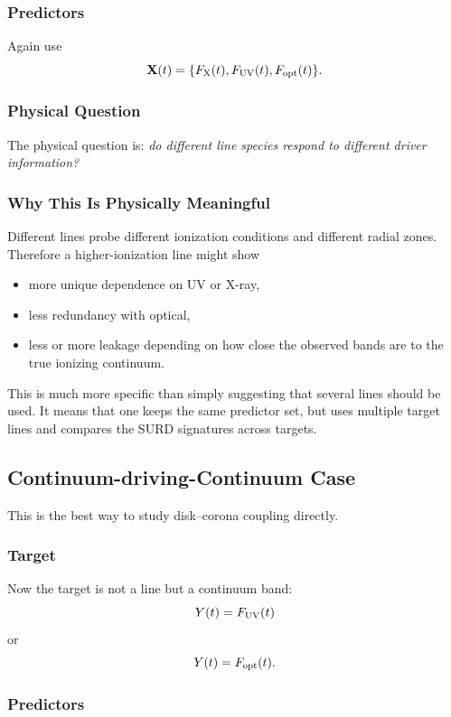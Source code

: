 \documentclass{article}
\begin{document}
\subsubsection{Predictors}

Again use
\[
\mathbf{X}(t)=\{F_{\rm X}(t),F_{\rm UV}(t),F_{\rm opt}(t)\}.
\]

\subsubsection{Physical Question}

The physical question is: \emph{do different line species respond to different driver information?}

\subsubsection{Why This Is Physically Meaningful}

Different lines probe different ionization conditions and different radial zones. Therefore a higher-ionization line might show
\begin{itemize}
    \item more unique dependence on UV or X-ray,
    \item less redundancy with optical,
    \item less or more leakage depending on how close the observed bands are to the true ionizing continuum.
\end{itemize}

This is much more specific than simply suggesting that several lines should be used. It means that one keeps the same predictor set, but uses multiple target lines and compares the SURD signatures across targets.

\subsection{Continuum-driving-Continuum Case}

This is the best way to study disk--corona coupling directly.

\subsubsection{Target}

Now the target is not a line but a continuum band:
\[
Y(t)=F_{\rm UV}(t)
\]
or
\[
Y(t)=F_{\rm opt}(t).
\]

\subsubsection{Predictors}
\end{document}
